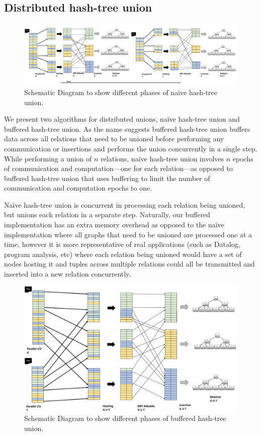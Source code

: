 \subsection{Distributed hash-tree union}

\begin{figure}[h]
	\includegraphics[width=\textwidth]{results/union_1.pdf}
	\caption{Schematic Diagram to show different phases of naive hash-tree union.}
	\label{fig:union_1}
\end{figure}

We present two algorithms for distributed unions, na\"ive hash-tree union and buffered hash-tree union. As the name suggests buffered hash-tree union buffers data across all relations that need to be unioned before performing any communication or insertions and performs the union concurrently in a single step. While performing a union of $n$ relations, na\"ive hash-tree union involves $n$ epochs of communication and computation---one for each relation---as opposed to buffered hash-tree union that uses buffering to limit the number of communication and computation epochs to one.

Na\"ive hash-tree union is concurrent in processing each relation being unioned, but unions each relation in a separate step. Naturally, our buffered implementation has an extra memory overhead as opposed to the na\"ive implementation where all graphs that need to be unioned are processed one at a time, however it is more representative of real applications (such as Datalog, program analysis, etc) where each relation being unioned would have a set of nodes hosting it and tuples across multiple relations could all be transmitted and inserted into a new relation concurrently.

\begin{figure}[h]
	\includegraphics[width=\columnwidth]{results/union_2.pdf}
	\caption{Schematic Diagram to show different phases of buffered hash-tree union.}
	\label{fig:union_2}
\end{figure}

